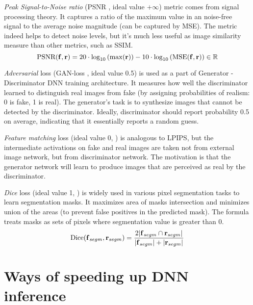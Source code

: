 	
\textit{Peak Signal-to-Noise ratio} (PSNR \cite{metric:psnr13}, ideal value $+\infty$) metric comes from signal processing theory. It captures a ratio of the maximum value in an noise-free signal to the average noise magnitude (can be captured by MSE). The metric indeed helps to detect noise levels, but it's much less useful as image similarity measure than other metrics, such as SSIM.
\begin{equation}
	\setlength\abovedisplayskip{0pt} 
	\text{PSNR}(\bmr{f}, \bmr{r}) = 20 \cdot \log_{10} \left( \max(\bmr{r}) \right) - 10 \cdot \log_{10}\left( \text{MSE}(\bmr{f}, \bmr{r}) \right) \in \mathbb{R} \setlength\belowdisplayskip{0pt} 
\end{equation}
	
\textit{Adversarial} loss (GAN-loss \cite{dnn:gan14}, ideal value 0.5) is used as a part of Generator - Discriminator DNN training architecture. It measures how well the discriminator learned to distinguish real images from fake (by assigning probabilities of realism: 0 is fake, 1 is real). The generator's task is to synthesize images that cannot be detected by the discriminator. Ideally, discriminator should report probability 0.5 on average, indicating that it essentially reports a random guess.

\textit{Feature matching} loss (ideal value 0, \cite{metric:fm16}) is analogous to LPIPS, but the intermediate activations on fake and real images are taken not from external image network, but from discriminator network. The motivation is that the generator network will learn to produce images that are perceived as real by the discriminator.

\textit{Dice} loss (ideal value 1, \cite{metric:dice17}) is widely used in various pixel segmentation tasks to learn segmentation masks. It maximizes area of masks intersection and minimizes union of the areas (to prevent false positives in the predicted mask). The formula treats masks as sets of pixels where segmentation value is greater than 0.
\begin{equation}
	\setlength\abovedisplayskip{0pt} 
	\text{Dice}(\bmr{f}_{segm}, \bmr{r}_{segm}) = \frac{2 \lvert \bmr{f}_{segm} \cap \bmr{r}_{segm} \rvert}{ \lvert \bmr{f}_{segm} \rvert + \lvert \bmr{r}_{segm} \rvert} \setlength\belowdisplayskip{0pt} 
\end{equation}

\section{Ways of speeding up DNN inference}
\label{lit:dnn-speedup}

